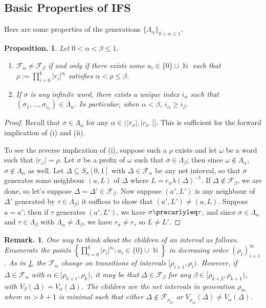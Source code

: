 \documentclass[11pt, a4paper]{memoir}
\DeclareMathOperator{\N}{{\mathbb{N}}}
\theoremstyle{change}
\newtheorem{proposition}[theorem]{Proposition.}
\theoremstyle{plain}
\theoremstyle{nonumberplain}
\newtheorem{remark}{Remark.}
\newtheorem{proof}{Proof}
\numberwithin{equation}{section}
\begin{document}
\subsection{Basic Properties of IFS}
Here are some properties of the generations $\{\Lambda_\alpha\}_{0<\alpha\leq 1}$.
\begin{proposition}\label{p:gfin}
    Let $0<\alpha<\beta\leq 1$.
    \begin{enumerate}[nl,r]
        \item $\mathcal{F}_\alpha\neq\mathcal{F}_\beta$ if and only if there exists some $a_i\in\{0\}\cup\N$ such that $\rho:=\prod_{i=0}^k |r_i|^{a_i}$ satisfies $\alpha<\rho\leq\beta$.
        \item If $\sigma$ is any infinite word, there exists a unique index $i_\alpha$ such that $(\sigma_1,\ldots,\sigma_{i_\alpha})\in\Lambda_\alpha$.
            In particular, when $\alpha<\beta$, $i_\alpha\geq i_\beta$.
    \end{enumerate}
\end{proposition}
\begin{proof}
    Recall that $\sigma\in\Lambda_\alpha$ for any $\alpha\in(|r_\sigma|,|r_{\sigma^-}|]$.
    This is sufficient for the forward implication of (i) and (ii).

    To see the reverse implication of (i), suppose such a $\rho$ exists and let $\omega$ be a word such that $|r_\omega|=\rho$.
    Let $\sigma$ be a prefix of $\omega$ such that $\sigma\in\Lambda_\beta$; then since $\omega\notin\Lambda_\alpha$, $\sigma\notin\Lambda_\alpha$ as well.
    Let $\Delta\subseteq S_\sigma[0,1]$ with $\Delta\in\mathcal{F}_\alpha$ be any net interval, so that $\sigma$ generates some neighbour $(a,L)$ of $\Delta$ where $L=r_\sigma \lambda(\Delta)^{-1}$.
    If $\Delta\notin\mathcal{F}_\beta$, we are done, so let's suppose $\Delta=\Delta'\in\mathcal{F}_\beta$.
    Now suppose $(a',L')$ is any neighbour of $\Delta'$ generated by $\tau\in\Lambda_\beta$; it suffices to show that $(a',L')\neq(a,L)$.
    Suppose $a=a'$; then if $\tau$ generates $(a',L')$, we have $\sigma\precurlyleq\tau$, and since $\sigma\in\Lambda_\alpha$ and $\tau\in\Lambda_\beta$ with $\Lambda_\alpha\neq\Lambda_\beta$, we have $r_\sigma\neq r_\tau$ so $L\neq L'$.
\end{proof}
\begin{remark}
    One way to think about the children of an interval as follows.
    Enumerate the points $\left\{\prod_{i=0}^k|r_i|^{a_i}:a_i\in\{0\}\cup\N\right\}$ in decreasing order $(\rho_i)_{i=1}^\infty$.
    As in \cref{p:gfin}, the $\mathcal{F}_\alpha$ change on transitions of intervals $[\rho_{i+1},\rho_{i})$.
    However, if $\Delta\in\mathcal{F}_\alpha$ with $\alpha\in[\rho_{k+1},\rho_k)$, it may be that $\Delta\in \mathcal{F}_\beta$ for any $\beta\in[\rho_{k+2},\rho_{k+1})$, with $V_\beta(\Delta)=V_\alpha(\Delta)$.
    The children are the net intervals in generation $\rho_{m}$ where $m> k+1$ is minimal such that either $\Delta\notin\mathcal{F}_{\rho_m}$ or $V_{\rho_m}(\Delta)\neq V_\alpha(\Delta)$.
\end{remark}
\end{document}
